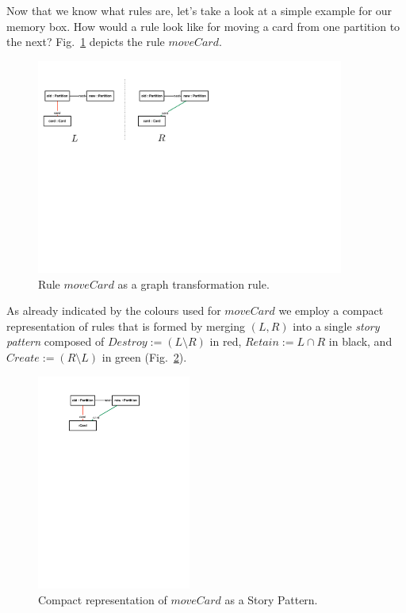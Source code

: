Now that we know what rules are, let's take a look at a simple example for our
memory box. How would a rule look like for moving a card from one partition to
the next?  Fig.~\ref{fig:rule_example} depicts the rule $moveCard$.
  
\begin{figure}[htp]
\begin{center}
  \includegraphics[width=0.9\textwidth]{pics/installationAndSetup/rule_example}
  \caption[]{Rule $moveCard$ as a graph transformation rule.}	
  \label{fig:rule_example}
\end{center}
\end{figure}

\clearpage

As already indicated by the colours used for $moveCard$ we employ a compact
representation of rules that is formed by merging $(L,R)$ into a single
\emph{story pattern} composed of  $Destroy := (L\setminus R)$ in red, $Retain := 
L\cap R$ in black, and $Create := (R\setminus L)$ in  green
(Fig.~\ref{fig:rule_compact}).
\begin{figure}[htp]
\begin{center}
  \includegraphics[width=0.45\textwidth]{pics/installationAndSetup/rule_compact}
  \caption[]{Compact representation of $moveCard$ as a Story Pattern.}
  \label{fig:rule_compact}
\end{center}
\end{figure}

